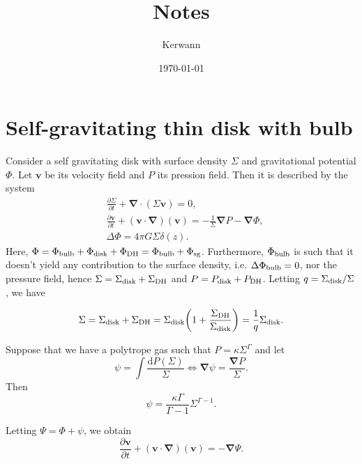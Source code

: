 \documentclass[11pt]{article}
\author{Kerwann}
\date{\today}
\title{Notes}
\newcommand{\bv}{\boldsymbol{v}}
\newcommand{\bnab}{\boldsymbol{\nabla}}
\newcommand{\rd}{\mathrm{d}}
\newcommand{\Sigmad}{\Sigma_{\rm{disk}}}
\newcommand{\Sigmadh}{\Sigma_{\rm{DH}}}
\newcommand{\Phib}{\Phi_{\rm{bulb}}}
\newcommand{\Phid}{\Phi_{\rm{disk}}}
\newcommand{\Phidh}{\Phi_{\rm{DH}}}
\newcommand{\Phisg}{\Phi_{\rm{sg}}}
\begin{document}
\maketitle

\tableofcontents


\section{Self-gravitating thin disk with bulb}
\label{sec:sg_disk}

Consider a self gravitating disk with surface density $\Sigma$ and gravitational potential $\Phi$. Let $\bv$ be its velocity field and $P$ its pression field. Then it is described by the system
\begin{align}
&\frac{\partial \Sigma}{\partial t} + \bnab \cdot (\Sigma \bv) = 0 ,\\
&\frac{\partial \bv}{\partial t} + (\bv \cdot \bnab)(\bv) = -\frac{1}{\Sigma} \bnab P - \bnab \Phi ,\\
& \Delta \Phi = 4\pi G \Sigma \delta (z).
\end{align}
Here, $\Phi =\Phib+  \Phid +  \Phidh=\Phib +  \Phisg$. Furthermore, $\Phib$  is such that it doesn't yield any contribution to the surface density, i.e. $\Delta \Phib=0$, nor the pressure field, hence $\Sigma =\Sigmad+\Sigmadh$ and $P =P_{\rm{disk}}+P_{\rm{DH}}$. Letting $q=\Sigmad/\Sigma$, we have

\begin{equation}
\Sigma=\Sigmad+\Sigma_{\rm{DH}}=\Sigmad\bigg(1+\frac{\Sigmadh}{\Sigmad}\bigg) =\frac{1}{q} \Sigmad.
\end{equation}

Suppose that we have a polytrope gas such that $P=\kappa \Sigma^{\Gamma}$ and let
\begin{equation}
\psi = \int \frac{\rd P(\Sigma)}{\Sigma} \Leftrightarrow \bnab \psi = \frac{\bnab P}{\Sigma}.
\end{equation}
 Then
 \begin{equation}
\psi = \frac{\kappa \Gamma}{\Gamma-1} \Sigma^{\Gamma-1}.
\end{equation}
 
 Letting $\Psi = \Phi + \psi$, we obtain
\begin{equation}
\frac{\partial \bv}{\partial t} + (\bv \cdot \bnab)(\bv) = - \bnab \Psi.
\end{equation}
\end{document}
